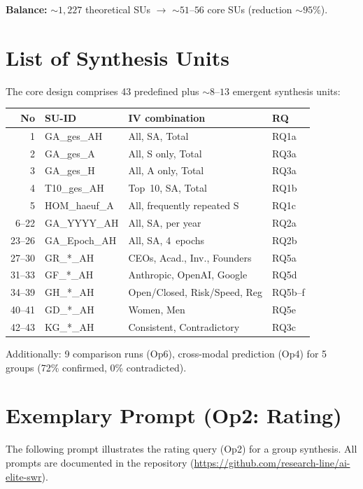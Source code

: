 \documentclass[12pt,a4paper]{article}
\begin{document}
\textbf{Balance:} ${\sim}1{,}227$ theoretical SUs $\to$ ${\sim}51$--$56$ core SUs (reduction ${\sim}95$\%).


\section{List of Synthesis Units}
\label{app:se}

The core design comprises 43 predefined plus ${\sim}8$--$13$ emergent synthesis units:

{\small
\begin{longtable}{r l l l}
  \toprule
  \textbf{No} & \textbf{SU-ID} & \textbf{IV combination} & \textbf{RQ} \\
  \midrule
  \endfirsthead
  1 & GA\_ges\_AH & All, SA, Total & RQ1a \\
  2 & GA\_ges\_A & All, S only, Total & RQ3a \\
  3 & GA\_ges\_H & All, A only, Total & RQ3a \\
  4 & T10\_ges\_AH & Top~10, SA, Total & RQ1b \\
  5 & HOM\_haeuf\_A & All, frequently repeated S & RQ1c \\
  6--22 & GA\_YYYY\_AH & All, SA, per year & RQ2a \\
  23--26 & GA\_Epoch\_AH & All, SA, 4~epochs & RQ2b \\
  27--30 & GR\_*\_AH & CEOs, Acad., Inv., Founders & RQ5a \\
  31--33 & GF\_*\_AH & Anthropic, OpenAI, Google & RQ5d \\
  34--39 & GH\_*\_AH & Open/Closed, Risk/Speed, Reg & RQ5b--f \\
  40--41 & GD\_*\_AH & Women, Men & RQ5e \\
  42--43 & KG\_*\_AH & Consistent, Contradictory & RQ3c \\
  \bottomrule
\end{longtable}
}

Additionally: 9 comparison runs (Op6), cross-modal prediction (Op4) for 5 groups (72\% confirmed, 0\% contradicted).


\section{Exemplary Prompt (Op2: Rating)}
\label{app:prompt}

The following prompt illustrates the rating query (Op2) for a group synthesis. All prompts are documented in the repository (\url{https://github.com/research-line/ai-elite-swr}).
\end{document}
